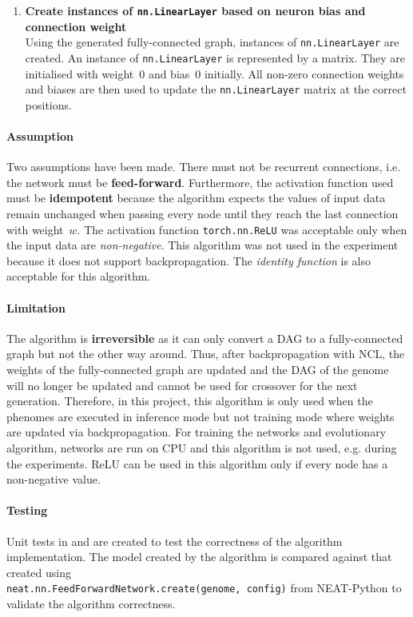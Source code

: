 \begin{enumerate}
    \item \textbf{Create instances of \texttt{nn.LinearLayer} based on neuron bias and connection weight} \\
    Using the generated fully-connected graph, instances of \texttt{nn.LinearLayer} are created. An instance of \texttt{nn.LinearLayer} is represented by a matrix. They are initialised with weight~$0$ and bias~$0$ initially. All non-zero connection weights and biases are then used to update the \texttt{nn.LinearLayer} matrix at the correct positions. 
\end{enumerate}

\paragraph{Assumption}
Two assumptions have been made. There must not be recurrent connections, i.e. the network must be \textbf{feed-forward}. Furthermore, the activation function used must be \textbf{idempotent} because the algorithm expects the values of input data remain unchanged when passing every node until they reach the last connection with weight~$w$. The activation function \texttt{torch.nn.ReLU} was acceptable only when the input data are \textit{non-negative}. This algorithm was not used in the experiment because it does not support backpropagation. The \textit{identity function} is also acceptable for this algorithm. 

\paragraph{Limitation}
The algorithm is \textbf{irreversible} as it can only convert a DAG to a fully-connected graph but not the other way around. Thus, after backpropagation with NCL, the weights of the fully-connected graph are updated and the DAG of the genome will no longer be updated and cannot be used for crossover for the next generation. Therefore, in this project, this algorithm is only used when the phenomes are executed in inference mode but not training mode where weights are updated via backpropagation. For training the networks and evolutionary algorithm, networks are run on CPU and this algorithm is not used, e.g. during the experiments. 
ReLU can be used in this algorithm only if every node has a non-negative value. 

\paragraph{Testing}
Unit tests in  and  are created to test the correctness of the algorithm implementation. The model created by the algorithm is compared against that created using 
\\
\texttt{neat.nn.FeedForwardNetwork.create(genome, config)} from NEAT-Python to validate the algorithm correctness. 

